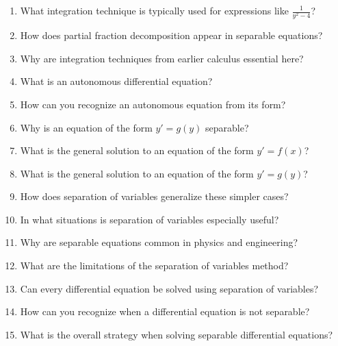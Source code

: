 \begin{enumerate}
\item What integration technique is typically used for expressions like $\frac{1}{y^2 - 4}$?

\item How does partial fraction decomposition appear in separable equations?

\item Why are integration techniques from earlier calculus essential here?

\item What is an autonomous differential equation?

\item How can you recognize an autonomous equation from its form?

\item Why is an equation of the form $y' = g(y)$ separable?

\item What is the general solution to an equation of the form $y' = f(x)$?

\item What is the general solution to an equation of the form $y' = g(y)$?

\item How does separation of variables generalize these simpler cases?

\item In what situations is separation of variables especially useful?

\item Why are separable equations common in physics and engineering?

\item What are the limitations of the separation of variables method?

\item Can every differential equation be solved using separation of variables?

\item How can you recognize when a differential equation is not separable?

\item What is the overall strategy when solving separable differential equations?

\end{enumerate}
